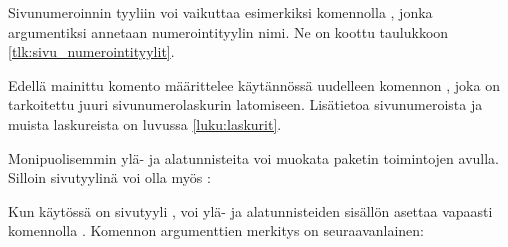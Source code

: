 \begin{koodilohkosis}
{}        %
\end{koodilohkosis}

Sivunumeroinnin tyyliin voi vaikuttaa esimerkiksi komennolla
, jonka argumentiksi annetaan numerointityylin
nimi. Ne on koottu taulukkoon \ref{tlk:sivu_numerointityylit}.

\begin{koodilohkosis}
\end{koodilohkosis}

Edellä mainittu komento määrittelee käytännössä uudelleen komennon
, joka on tarkoitettu juuri sivunumerolaskurin
latomiseen. Lisätietoa sivunumeroista ja muista laskureista on luvussa
\ref{luku:laskurit}.


Monipuolisemmin ylä- ja alatunnisteita voi muokata paketin
 toimintojen avulla. Silloin
sivutyylinä voi olla myös :

\begin{koodilohkosis}
\usepackage{fancyhdr}
\pagestyle{fancy}
\end{koodilohkosis}

Kun käytössä on sivutyyli , voi ylä- ja alatunnisteiden
sisällön asettaa vapaasti komennolla . Komennon
argumenttien merkitys on seuraavanlainen:

\begin{koodilohkosis}
\end{koodilohkosis}

